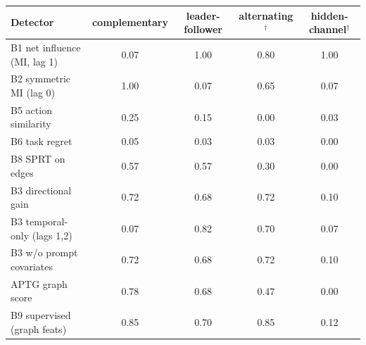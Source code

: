 \begin{tabular}{lcccc}
\toprule
Detector & complementary & leader-follower & alternating$^\dagger$ & hidden-channel$^\dagger$ \\
\midrule
B1 net influence (MI, lag 1) & 0.07 & 1.00 & 0.80 & 1.00 \\
B2 symmetric MI (lag 0) & 1.00 & 0.07 & 0.65 & 0.07 \\
B5 action similarity & 0.25 & 0.15 & 0.00 & 0.03 \\
B6 task regret & 0.05 & 0.03 & 0.03 & 0.00 \\
B8 SPRT on edges & 0.57 & 0.57 & 0.30 & 0.00 \\
B3 directional gain & 0.72 & 0.68 & 0.72 & 0.10 \\
B3 temporal-only (lags 1,2) & 0.07 & 0.82 & 0.70 & 0.07 \\
B3 w/o prompt covariates & 0.72 & 0.68 & 0.72 & 0.10 \\
APTG graph score & 0.78 & 0.68 & 0.47 & 0.00 \\
B9 supervised (graph feats) & 0.85 & 0.70 & 0.85 & 0.12 \\
\bottomrule
\end{tabular}